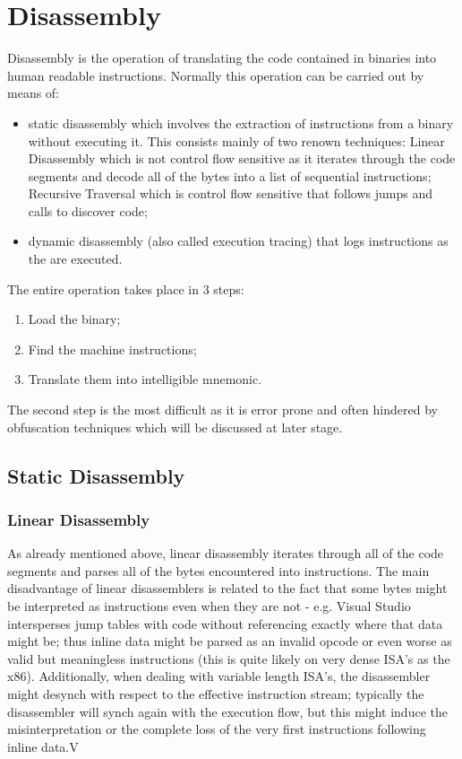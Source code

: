 \chapter{Disassembly}

Disassembly is the operation of translating the code contained in binaries into human readable instructions. Normally
this operation can be carried out by means of:
\begin{itemize}
    \item static disassembly which involves the extraction of instructions from a binary without executing it. This
        consists mainly of two renown techniques:
        \subitem Linear Disassembly which is not control flow sensitive as it iterates through the code segments and
        decode all of the bytes into a list of sequential instructions;
        \subitem Recursive Traversal which is control flow sensitive that follows jumps and calls to discover code;
    \item dynamic disassembly (also called execution tracing) that logs instructions as the are executed.
\end{itemize}
The entire operation takes place in 3 steps:
\begin{enumerate}
    \item Load the binary;
    \item Find the machine instructions;
    \item Translate them into intelligible mnemonic.
\end{enumerate}
The second step is the most difficult as it is error prone and often hindered by obfuscation techniques which will be
discussed at later stage.


\section{Static Disassembly}

\subsection{Linear Disassembly}
As already mentioned above, linear disassembly iterates through all of the code segments and parses all of the bytes
encountered into instructions. The main disadvantage of linear disassemblers is related to the fact that some bytes
might be interpreted as instructions even when they are not - e.g. Visual Studio intersperses jump tables with code
without referencing exactly where that data might be; thus inline data might be parsed as an invalid opcode or even
worse as valid but meaningless instructions (this is quite likely on very dense ISA's as the x86).
Additionally, when dealing with variable length ISA's, the disassembler might desynch with respect to the effective
instruction stream; typically the disassembler will synch again with the execution flow, but this might induce the
misinterpretation or the complete loss of the very first instructions following inline data.V


